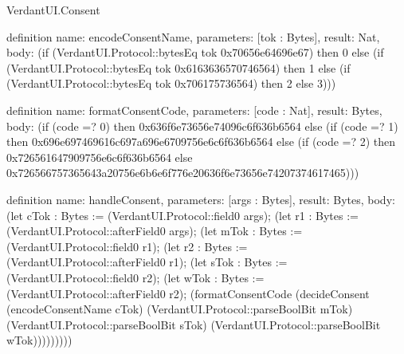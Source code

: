 \begin{lexlean}{VerdantUI.Consent}
\begin{semanticmodule}
definition{
  name: encodeConsentName,
  parameters: [tok : Bytes],
  result: Nat,
  body: (if (VerdantUI.Protocol::bytesEq tok 0x70656e64696e67) then 0 else (if (VerdantUI.Protocol::bytesEq tok 0x6163636570746564) then 1 else (if (VerdantUI.Protocol::bytesEq tok 0x706175736564) then 2 else 3)))
}

definition{
  name: formatConsentCode,
  parameters: [code : Nat],
  result: Bytes,
  body: (if (code =? 0) then 0x636f6e73656e74096c6f636b6564 else (if (code =? 1) then 0x696e697469616c697a696e6709756e6c6f636b6564 else (if (code =? 2) then 0x726561647909756e6c6f636b6564 else 0x726566757365643a20756e6b6e6f776e20636f6e73656e74207374617465)))
}

definition{
  name: handleConsent,
  parameters: [args : Bytes],
  result: Bytes,
  body: (let cTok : Bytes := (VerdantUI.Protocol::field0 args);
    (let r1 : Bytes := (VerdantUI.Protocol::afterField0 args);
    (let mTok : Bytes := (VerdantUI.Protocol::field0 r1);
    (let r2 : Bytes := (VerdantUI.Protocol::afterField0 r1);
    (let sTok : Bytes := (VerdantUI.Protocol::field0 r2);
    (let wTok : Bytes := (VerdantUI.Protocol::afterField0 r2);
    (formatConsentCode (decideConsent (encodeConsentName cTok) (VerdantUI.Protocol::parseBoolBit mTok) (VerdantUI.Protocol::parseBoolBit sTok) (VerdantUI.Protocol::parseBoolBit wTok)))))))))
}
\end{semanticmodule}
\end{lexlean}
